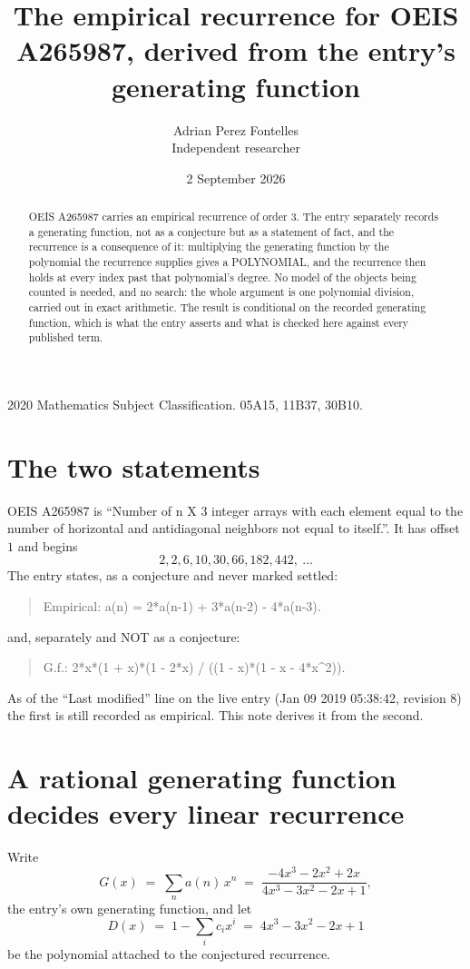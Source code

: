 \documentclass[11pt,a4paper]{article}
\title{The empirical recurrence for OEIS A265987, derived from the entry's generating function}
\author{Adrian Perez Fontelles\\ \small Independent researcher}
\date{2 September 2026}
\theoremstyle{plain}
\theoremstyle{definition}
\begin{document}
\maketitle

\begin{abstract}
OEIS A265987 carries an empirical recurrence of order $3$. The entry separately records a
generating function, not as a conjecture but as a statement of fact, and the recurrence is a
consequence of it: multiplying the generating function by the polynomial the recurrence
supplies gives a POLYNOMIAL, and the recurrence then holds at every index past that
polynomial's degree. No model of the objects being counted is needed, and no search: the
whole argument is one polynomial division, carried out in exact arithmetic. The result is
conditional on the recorded generating function, which is what the entry asserts and what is
checked here against every published term.
\end{abstract}

\noindent\small 2020 Mathematics Subject Classification. 05A15, 11B37, 30B10.\normalsize

\section{The two statements}

OEIS A265987 is ``Number of n X 3 integer arrays with each element equal to the number of horizontal and antidiagonal neighbors not equal to itself.''. It has offset $1$ and begins
\[
2, 2, 6, 10, 30, 66, 182, 442,\ \dots
\]
The entry states, as a conjecture and never marked settled:
\begin{quote}
Empirical: a(n) = 2*a(n-1) + 3*a(n-2) - 4*a(n-3).
\end{quote}
and, separately and NOT as a conjecture:
\begin{quote}
G.f.: 2*x*(1 + x)*(1 - 2*x) / ((1 - x)*(1 - x - 4*x\^{}2)).
\end{quote}
As of the ``Last modified'' line on the live entry (Jan 09 2019 05:38:42, revision 8) the first is still
recorded as empirical. This note derives it from the second.

\section{A rational generating function decides every linear recurrence}

Write
\[
G(x)\;=\;\sum_{n}a(n)\,x^{n}\;=\;\frac{- 4 x^{3} - 2 x^{2} + 2 x}{4 x^{3} - 3 x^{2} - 2 x + 1},
\]
the entry's own generating function, and let
\[
D(x)\;=\;1-\sum_i c_i x^{i}\;=\;4 x^{3} - 3 x^{2} - 2 x + 1
\]
be the polynomial attached to the conjectured recurrence.
\end{document}
